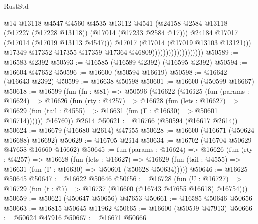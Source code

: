 \begin{lexlean}{RustStd}
\begin{coremodule}
                                              @14
                                              @13118
                                              @4547
                                              @4560
                                              @4535
                                              @13112
                                              @4541
                                              (@24158
                                                @2584
                                                @13118
                                                (@17227 (@17228 @13118))
                                                (@17014 (@17233 @2584 @17)))
                                              @24184
                                              @17017
                                              (@17014 (@17019 @13113 @4547)))
                                            @17017
                                            (@17014 (@17019 @13103 @13121)))
                                          @17349
                                          @17352
                                          @17355
                                          @17359
                                          @17364
                                          @46809)))))))))))))))))))
@50589 := @16583 @2392
@50593 := @16585 (@16589 @2392) (@16595 @2392)
@50594 := @16604 @47652
@50596 := @16600 (@50594 @16619)
@50598 := @16642 (@16643 @2392)
@50599 := @16638 @50598
@50601 := @16600 (@50599 @16667)
@50618 := @16599
    (fun (fn : @81) =>
    @50596
      (@16622
        (@16625
          (fun (params : @16624) =>
          @16626
            (fun (rty : @4257) =>
            @16628
              (fun (lets : @16627) =>
              @16629 (fun (tail : @4555) => @16631 (fun (Γ : @16630) => @50601 @16714))))))
        @16760))
    @2614
@50621 := @16766 (@50594 (@16617 @2614))
@50624 := @16679 (@16680 @2614) @47655
@50628 := @16600 (@16671 (@50624 @16688) @16692)
@50629 := @16705 @2614
@50634 := @16702 (@16704 @50629 @47658 @16660 @16662)
@50645 := fun (params : @16624) =>
  @16626
    (fun (rty : @4257) =>
    @16628
      (fun (lets : @16627) =>
      @16629 (fun (tail : @4555) => @16631 (fun (Γ : @16630) => @50601 (@50628 @50634)))))
@50646 := @16625 @50645
@50647 := @16622 @50646
@50656 := @16728
    (fun (U : @16727) => @16729 (fun (t : @7) => @16737 (@16600 (@16743 @47655 @16618) @16754)))
@50659 := @50621 (@50647 @50656) @47653
@50661 := @16585 @50646 @50656
@50663 := @16815 @50645 @11962
@50665 := @16600 (@50599 @47913)
@50666 := @50624 @47916
@50667 := @16671 @50666

\end{coremodule}
\end{lexlean}
